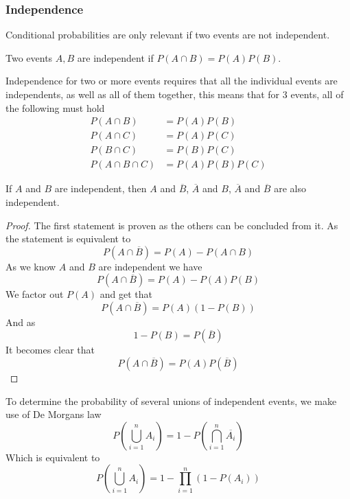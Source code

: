 \subsubsection{Independence}
Conditional probabilities are only relevant if two events are not independent.
\begin{definition}
  Two events $A,B$ are independent if $P(A\cap B)=P(A)P(B)$.
\end{definition}
Independence for two or more events requires that all the individual events are independents, as well as all of them together, this means that for 3 events, all of the following must hold
\begin{align*}
    P(A\cap B)&=P(A)P(B) \\
    P(A\cap C)&=P(A)P(C) \\
    P(B\cap C)&=P(B)P(C) \\
    P(A\cap B\cap C)&=P(A)P(B)P(C)
\end{align*}
\begin{theorem}
    If $A$ and $B$ are independent, then $A$ and $\overline{B}$, $\overline{A}$ and $B$, $\overline{A}$ and $\overline{B}$ are also independent.
\end{theorem}
\begin{proof}
  The first statement is proven as the others can be concluded from it. As the statement is equivalent to
  \[
      P(A\cap \overline{B})=P(A)-P(A\cap B)
  \]
  As we know $A$ and $B$ are independent we have
  \[
      P(A\cap\overline{B})=P(A)-P(A)P(B)
  \]
  We factor out $P(A)$ and get that
  \[
      P(A\cap\overline{B})=P(A)(1-P(B))
  \]
  And as
  \[
      1-P(B)=P(\overline{B})
  \]
  It becomes clear that
  \[
      P(A\cap\overline{B})=P(A)P(\overline{B})
  \]
\end{proof}
To determine the probability of several unions of independent events, we make use of De Morgans law
\[
    P\left(\bigcup_{i=1}^{n} A_{i}\right)=1-P\left(\bigcap_{i=1}^{n} \overline{A_{i}}\right)
\]
Which is equivalent to
\[
    P\left(\bigcup_{i=1}^{n} A_{i}\right)=1-\prod_{i=1}^{n} (1-P(A_{i}))
\]
